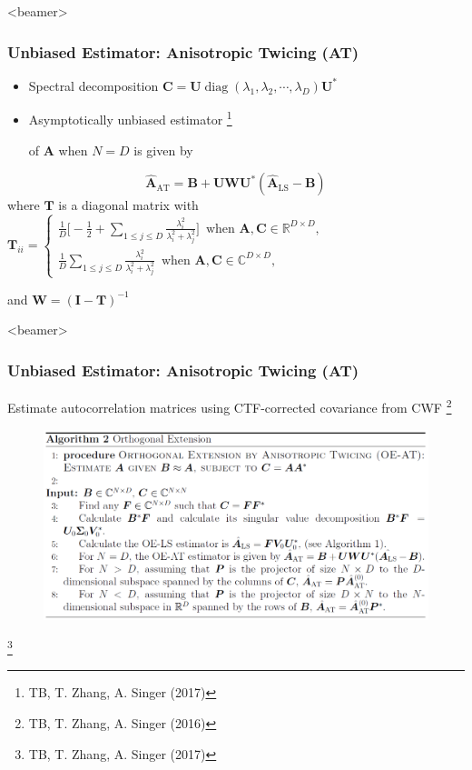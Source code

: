\documentclass{beamer}
\newcommand\blfootnote[1]{%
  \begingroup
  \renewcommand\thefootnote{}\footnote{#1}%
  \addtocounter{footnote}{-1}%
  \endgroup
}
\newcommand{\bC}{\boldsymbol{C}}
\newcommand{\bT}{\boldsymbol{T}}
\newcommand{\bW}{\boldsymbol{W}}
\newcommand{\bU}{\boldsymbol{U}}
\newcommand{\bI}{\boldsymbol{I}}
\def\bA{\boldsymbol{A}}
\def\bB{\boldsymbol{B}}
\newcommand{\diag}{\operatorname{diag}}
\begin{document}
\begin{frame}<beamer>
\frametitle{Unbiased Estimator: Anisotropic Twicing (AT)}
\begin{itemize}
\item Spectral decomposition $\bC=\bU\diag(\lambda_1,\lambda_2,\cdots,\lambda_D)\bU^*$
\item Asymptotically unbiased estimator \blfootnote{TB, T. Zhang, A. Singer (2017)} of $\bA$ when $N=D$ is given by
\end{itemize}

\begin{equation}
\hat{\bA}_{\text{AT}}=\bB+\bU\bW\bU^*(\hat{\bA}_{\text{LS}}-\bB) \nonumber
\end{equation}
where 
$\bT$ is a diagonal matrix with
$\bT_{ii}=\begin{cases}\frac{1}{D}\Big[-\frac{1}{2}+\sum_{1\leq j\leq 
D}\frac{\lambda_i^2}{\lambda_i^2+\lambda_j^2}\Big]\,\,\,\text{when 
$\bA,\bC\in\mathbb{R}^{D\times D}$},\\\frac{1}{D}\sum_{1\leq j\leq 
D}\frac{\lambda_i^2}{\lambda_i^2+\lambda_j^2}
\,\,\,\text{when $\bA,\bC\in\mathbb{C}^{D\times D}$},
\end{cases}$

and $\bW=(\bI-\bT)^{-1}$
\end{frame}

\begin{frame}<beamer>
\frametitle{Unbiased Estimator: Anisotropic Twicing (AT) }
Estimate autocorrelation matrices using CTF-corrected covariance from CWF \blfootnote{TB, T. Zhang, A. Singer (2016)}
\begin{figure}[!htbp]
\begin{center}
\includegraphics[scale=0.3]{figures/oeat_algo.png}
\end{center}
\end{figure}\blfootnote{TB, T. Zhang, A. Singer (2017)}
\end{frame}
\end{document}
